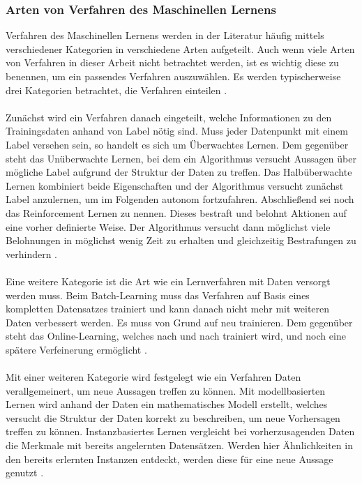 \documentclass[11pt,bibliography=totocnumbered]{scrartcl}
\begin{document}
\subsubsection{Arten von Verfahren des Maschinellen Lernens}
Verfahren des Maschinellen Lernens werden in der Literatur häufig mittels verschiedener Kategorien in verschiedene Arten aufgeteilt. Auch wenn viele Arten von Verfahren in dieser Arbeit nicht betrachtet werden, ist es wichtig diese zu benennen, um ein passendes Verfahren auszuwählen. Es werden typischerweise drei Kategorien betrachtet, die Verfahren einteilen \cite[S.8-14]{MACHINE_LEARNING}\cite[S.2]{BA}. 
\\\\
Zunächst wird ein Verfahren danach eingeteilt, welche Informationen zu den Trainingsdaten anhand von Label nötig sind. Muss jeder Datenpunkt mit einem Label versehen sein, so handelt es sich um Überwachtes Lernen. Dem gegenüber steht das Unüberwachte Lernen, bei dem ein Algorithmus versucht Aussagen über mögliche Label aufgrund der Struktur der Daten zu treffen. Das Halbüberwachte Lernen kombiniert beide Eigenschaften und der Algorithmus versucht zunächst Label anzulernen, um im Folgenden autonom fortzufahren. Abschließend sei noch das Reinforcement Lernen zu nennen. Dieses bestraft und belohnt Aktionen auf eine vorher definierte Weise. Der Algorithmus versucht dann möglichst viele Belohnungen in möglichst wenig Zeit zu erhalten und gleichzeitig Bestrafungen zu verhindern \cite[S.8-14]{MACHINE_LEARNING}\cite[S.2]{BA}.
\\\\
Eine weitere Kategorie ist die Art wie ein Lernverfahren mit Daten versorgt werden muss. Beim Batch-Learning muss das Verfahren auf Basis eines kompletten Datensatzes trainiert und kann danach nicht mehr mit weiteren Daten verbessert werden. Es muss von Grund auf neu trainieren. Dem gegenüber steht das Online-Learning, welches nach und nach trainiert wird, und noch eine spätere Verfeinerung ermöglicht \cite[S.14-17]{MACHINE_LEARNING}\cite[S.2]{BA}.
\\\\
Mit einer weiteren Kategorie wird festgelegt wie ein Verfahren Daten verallgemeinert, um neue Aussagen treffen zu können. Mit modellbasierten Lernen wird anhand der Daten ein mathematisches Modell erstellt, welches versucht die Struktur der Daten korrekt zu beschreiben, um neue Vorhersagen treffen zu können. Instanzbasiertes Lernen vergleicht bei vorherzusagenden Daten die Merkmale mit bereits angelernten Datensätzen. Werden hier Ähnlichkeiten in den bereits erlernten Instanzen entdeckt, werden diese für eine neue Aussage genutzt \cite[S.14-17]{MACHINE_LEARNING}\cite[S.2]{BA}.
\end{document}
